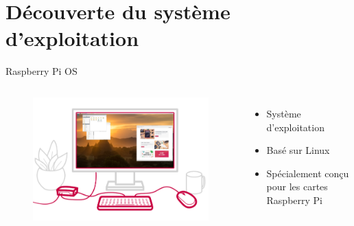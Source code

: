 \documentclass[aspectratio=169,xcolor=dvipsnames]{beamer}
\begin{document}
\section{Découverte du système d'exploitation}

\begin{frame}{Raspberry Pi OS}
    \begin{columns}[c] %

        \begin{figure}
            \includegraphics[width=1\textwidth]{images/rpi-os.png}
        \end{figure}

        \begin{itemize}
            \item Système d'exploitation
            \item Basé sur Linux
            \item Spécialement conçu pour les cartes Raspberry Pi
        \end{itemize}

    \end{columns}
\end{frame}

\end{document}
